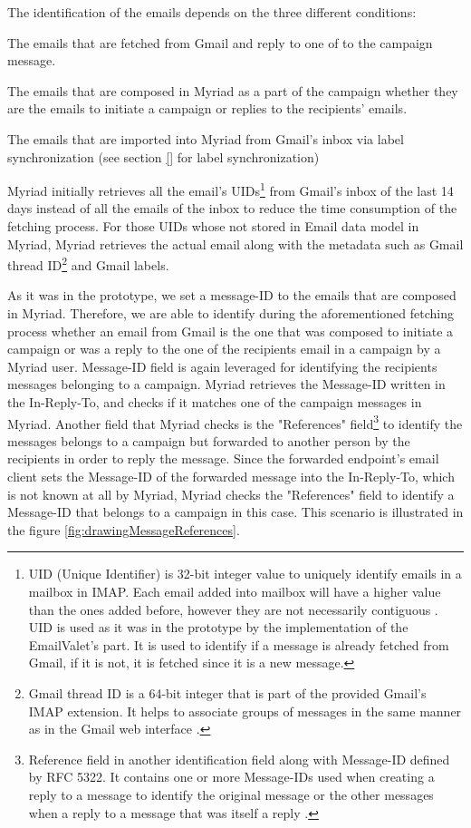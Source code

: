 The identification of the emails depends on the three different conditions:

\begin{compactenum}
	\item The emails that are fetched from Gmail and reply to one of to the campaign message.
	\item The emails that are composed in Myriad as a part of the campaign whether they are the emails to initiate a campaign or replies to the recipients' emails.
	\item The emails that are imported into Myriad from Gmail's inbox via label synchronization (see section \ref{} for label synchronization)
\end{compactenum}

Myriad initially retrieves all the email's \ac{UID}s\footnote{UID (Unique Identifier) is 32-bit integer value to uniquely identify emails in a mailbox in \ac{IMAP}. Each email added into mailbox will have a higher value than the ones added before, however they are not necessarily contiguous \citep{rfc3501}. \ac{UID} is used as it was in the prototype by the implementation of the EmailValet's part. It is used to identify if a message is already fetched from Gmail, if it is not, it is fetched since it is a new message.} from Gmail's inbox of the last 14 days instead of all the emails of the inbox to reduce the time consumption of the fetching process. For those \ac{UID}s whose not stored in Email data model in Myriad, Myriad retrieves the actual email along with the metadata such as Gmail thread ID\footnote{Gmail thread ID is a 64-bit integer that is part of the provided Gmail's IMAP extension. It helps to associate groups of messages in the same manner as in the Gmail web interface \citep{GoogleInc.2013a}.} and Gmail labels.
\vspace{1cm}

As it was in the prototype, we set a message-ID to the emails that are composed in Myriad. Therefore, we are able to identify during the aforementioned fetching process whether an email from Gmail is the one that was composed to initiate a campaign or was a reply to the one of the recipients email in a campaign by a Myriad user. Message-ID field is again leveraged for identifying the recipients messages belonging to a campaign. Myriad retrieves the Message-ID written in the In-Reply-To, and checks if it matches one of the campaign messages in Myriad. Another field that Myriad checks is the "References" field\footnote{Reference field in another identification field along with Message-ID defined by RFC 5322. It contains one or more Message-IDs used when creating a reply to a message to identify the original message or the other messages when a reply to a message that was itself a reply \citep{rfc5322}.} to identify the messages belongs to a campaign but forwarded to another person by the recipients in order to reply the message. Since the forwarded endpoint's email client sets the Message-ID of the forwarded message into the In-Reply-To, which is not known at all by Myriad, Myriad checks the "References" field to identify a Message-ID that belongs to a campaign in this case. This scenario is illustrated in the figure \ref{fig:drawingMessageReferences}.

